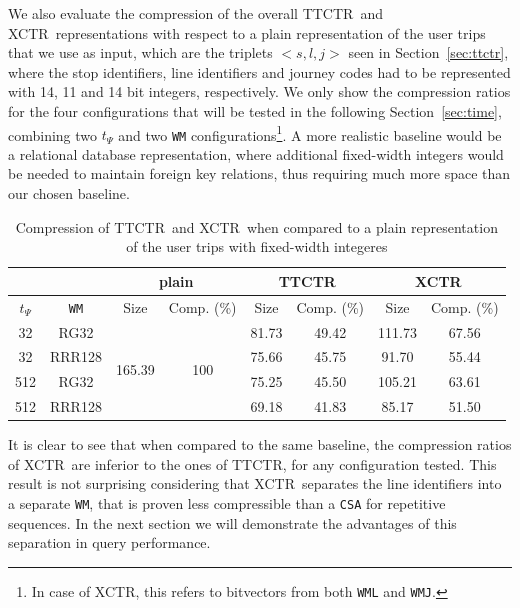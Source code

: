 \documentclass[runningheads]{llncs}
\newcommand{\ctr}{XCTR}
\newcommand{\ttctr}{TTCTR}
\begin{document}
We also evaluate the compression of the overall \ttctr~and \ctr~representations with respect to a plain representation of the user trips that we use as input, which are the triplets $<s,l,j>$ seen in Section~\ref{sec:ttctr}, where the stop identifiers, line identifiers and journey codes had to be represented with 14, 11 and 14 bit integers, respectively. We only show the compression ratios for the four configurations that will be tested in the following Section~\ref{sec:time}, combining two $t_{\Psi}$ and two \texttt{WM} configurations\footnote{In case of \ctr, this refers to bitvectors from both \texttt{WML} and \texttt{WMJ}.}. A more realistic baseline would be a relational database representation, where additional fixed-width integers would be needed to maintain foreign key relations, thus requiring much more space than our chosen baseline.

\begin{table}
    \centering
    \caption{Compression of \ttctr~and \ctr~when compared to a plain representation of the user trips with fixed-width integeres}
    \label{tab:comp}
    \begin{tabular}{|c|c|c|c|c|c|c|c|}
    \cline{3-8}
    \multicolumn{2}{c}{} & \multicolumn{2}{|c|}{plain} & \multicolumn{2}{|c|}{\ttctr} & \multicolumn{2}{|c|}{\ctr} \\
    \hline
    $t_{\Psi}$ & \texttt{WM} & Size & Comp. (\%) & Size & Comp. (\%) & Size & Comp. (\%) \\
    \hline
    32 & RG32 & \multirow{4}{*}{165.39} & \multirow{4}{*}{100} & 81.73 & 49.42 & 111.73 & 67.56 \\
    32 & RRR128 & & & 75.66 & 45.75 & 91.70 & 55.44 \\
    512 & RG32 & & & 75.25 & 45.50 & 105.21 & 63.61 \\
    512 & RRR128 & & & 69.18 & 41.83 & 85.17 & 51.50 \\
    \hline
    \end{tabular}
\end{table}

It is clear to see that when compared to the same baseline, the compression ratios of \ctr~are inferior to the ones of \ttctr, for any configuration tested. This result is not surprising considering that \ctr~separates the line identifiers into a separate \texttt{WM}, that is proven less compressible than a \texttt{CSA} for repetitive sequences. In the next section we will demonstrate the advantages of this separation in query performance.
\end{document}
